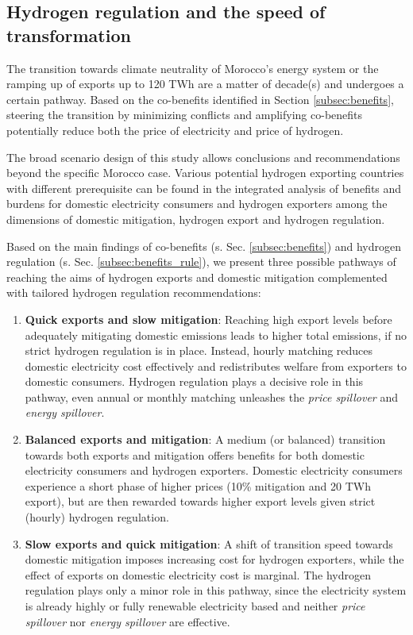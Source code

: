 \subsection{Hydrogen regulation and the speed of transformation}
\label{subsec:timepath}
The transition towards climate neutrality of Morocco's energy system or the ramping up of exports up to 120 TWh are a matter of decade(s) and undergoes a certain pathway. Based on the co-benefits identified in Section \ref{subsec:benefits}, steering the transition by minimizing conflicts and amplifying co-benefits potentially reduce both the price of electricity and price of hydrogen. 

The broad scenario design of this study allows conclusions and recommendations beyond the specific Morocco case.
Various potential hydrogen exporting countries with different prerequisite can be found in the integrated analysis of benefits and burdens for domestic electricity consumers and hydrogen exporters among the dimensions of domestic mitigation, hydrogen export and hydrogen regulation.

Based on the main findings of co-benefits (s. Sec. \ref{subsec:benefits}) and hydrogen regulation (s. Sec. \ref{subsec:benefits_rule}), we present three possible pathways of reaching the aims of hydrogen exports and domestic mitigation complemented with tailored hydrogen regulation recommendations:
\begin{enumerate}
    \item \textbf{Quick exports and slow mitigation}: Reaching high export levels before adequately mitigating domestic emissions leads to higher total emissions, if no strict hydrogen regulation is in place. Instead, hourly matching reduces domestic electricity cost effectively and redistributes welfare from exporters to domestic consumers. Hydrogen regulation plays a decisive role in this pathway, even annual or monthly matching unleashes the \textit{price spillover} and \textit{energy spillover}. 
    \item \textbf{Balanced exports and mitigation}: A medium (or balanced) transition towards both exports and mitigation offers benefits for both domestic electricity consumers and hydrogen exporters. Domestic electricity consumers experience a short phase of higher prices (10\% mitigation and 20 TWh export), but are then rewarded towards higher export levels given strict (hourly) hydrogen regulation.
    \item \textbf{Slow exports and quick mitigation}: A shift of transition speed towards domestic mitigation imposes increasing cost for hydrogen exporters, while the effect of exports on domestic electricity cost is marginal. The hydrogen regulation plays only a minor role in this pathway, since the electricity system is already highly or fully renewable electricity based and neither \textit{price spillover} nor \textit{energy spillover} are effective.
\end{enumerate}

